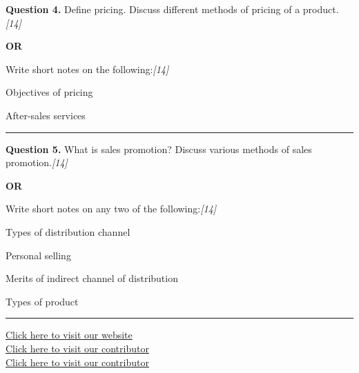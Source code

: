 \documentclass[11pt,a4paper]{article}
\newcommand{\pts}[1]{\hfill   \textit{[#1]}}
\begin{document}
\noindent   \textbf{Question 4.}
Define pricing. Discuss different methods of pricing of a product.\pts{14}

\centerline{   \textbf{OR}}

Write short notes on the following:\pts{14}

\begin{parts}
  \item Objectives of pricing
  \item After-sales services
\end{parts}

\medskip\rule{\linewidth}{0.2pt}




\noindent   \textbf{Question 5.}
What is sales promotion? Discuss various methods of sales promotion.\pts{14}

\centerline{   \textbf{OR}}

Write short notes on any two of the following:\pts{14}

\begin{parts}
  \item Types of distribution channel
  \item Personal selling
  \item Merits of indirect channel of distribution
  \item Types of product
\end{parts}

\vfill
\rule{\linewidth}{0.4pt}

\begin{center}\small
\href{https://bhu-exam.vercel.app/}{Click here to visit our website}\\[4pt]
\href{https://me-aryan.vercel.app/}{Click here to visit our contributor}\\[4pt]
\href{https://quashan-me.vercel.app/}{Click here to visit our contributor}
\end{center}
\end{document}

